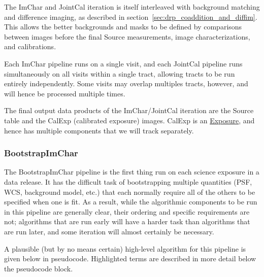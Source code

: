 The ImChar and JointCal iteration is itself interleaved with background matching and difference imaging, as described in section~\ref{sec:drp_coaddition_and_diffim}.  This allows the better backgrounds and masks to be defined by comparisons between images before the final Source measurements, image characterizations, and calibrations.

Each ImChar pipeline runs on a single visit, and each JointCal pipeline runs simultaneously on all visits within a single tract, allowing tracts to be run entirely independently.  Some visits may overlap multiples tracts, however, and will hence be processed multiple times.

The final output data products of the ImChar/JointCal iteration are the Source table and the CalExp (calibrated exposure) images.  CalExp is an \hyperref[sec:spImagesExposure]{Exposure}, and hence has multiple components that we will track separately.

\subsubsection{BootstrapImChar}
\label{sec:drpBootstrapImChar}

The BootstrapImChar pipeline is the first thing run on each science exposure in a data release.  It has the difficult task of bootstrapping multiple quantities (PSF, WCS, background model, etc.) that each normally require all of the others to be specified when one is fit.  As a result, while the algorithmic components to be run in this pipeline are generally clear, their ordering and specific requirements are not; algorithms that are run early will have a harder task than algorithms that are run later, and some iteration will almost certainly be necessary.

A plausible (but by no means certain) high-level algorithm for this pipeline is given below in pseudocode.  Highlighted terms are described in more detail below the pseudocode block.


\newcommand{\hr}[1]{\hyperref[sec:drpBootstrapImChar_#1]{#1}}

